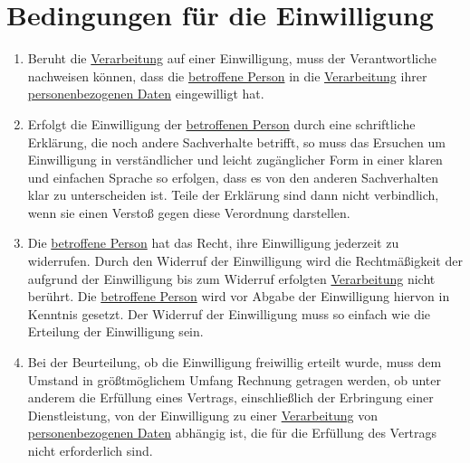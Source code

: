 \chapter{Bedingungen für die Einwilligung}
\label{ch:7}


\begin{enumerate}

  \item Beruht die \hyperref[itm:04-2]{Verarbeitung} auf einer Einwilligung, muss der Verantwortliche nachweisen können, dass die \hyperref[itm:04-1]{betroffene
   Person} in die \hyperref[itm:04-2]{Verarbeitung} ihrer \hyperref[itm:04-1]{personenbezogenen Daten} eingewilligt hat.
  \label{itm:07-1}

  \item Erfolgt die Einwilligung der \hyperref[itm:04-1]{betroffenen Person} durch eine schriftliche Erklärung, die noch andere Sachverhalte
   betrifft, so muss das Ersuchen um Einwilligung in verständlicher und leicht zugänglicher Form in einer klaren und
   einfachen Sprache so erfolgen, dass es von den anderen Sachverhalten klar zu unterscheiden ist. Teile der Erklärung
   sind dann nicht verbindlich, wenn sie einen Verstoß gegen diese Verordnung darstellen.
  \label{itm:07-2}

  \item Die \hyperref[itm:04-1]{betroffene Person} hat das Recht, ihre Einwilligung jederzeit zu widerrufen. Durch den Widerruf der
   Einwilligung wird die Rechtmäßigkeit der aufgrund der Einwilligung bis zum Widerruf erfolgten \hyperref[itm:04-2]{Verarbeitung} nicht
   berührt. Die \hyperref[itm:04-1]{betroffene Person} wird vor Abgabe der Einwilligung hiervon in Kenntnis gesetzt. Der Widerruf der
   Einwilligung muss so einfach wie die Erteilung der Einwilligung sein.
  \label{itm:07-3}

  \item Bei der Beurteilung, ob die Einwilligung freiwillig erteilt wurde, muss dem Umstand in größtmöglichem Umfang
   Rechnung getragen werden, ob unter anderem die Erfüllung eines Vertrags, einschließlich der Erbringung einer
   Dienstleistung, von der Einwilligung zu einer \hyperref[itm:04-2]{Verarbeitung} von \hyperref[itm:04-1]{personenbezogenen Daten} abhängig ist, die für die
   Erfüllung des Vertrags nicht erforderlich sind.
  \label{itm:07-4}

\end{enumerate}


